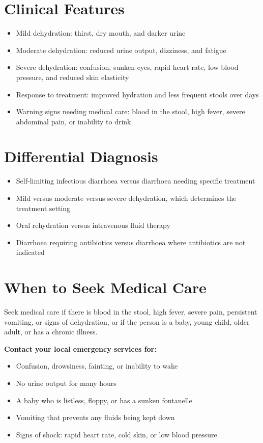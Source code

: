 \section*{Clinical Features}
\begin{itemize}
    \item Mild dehydration: thirst, dry mouth, and darker urine
    \item Moderate dehydration: reduced urine output, dizziness, and fatigue
    \item Severe dehydration: confusion, sunken eyes, rapid heart rate, low blood pressure, and reduced skin elasticity
    \item Response to treatment: improved hydration and less frequent stools over days
    \item Warning signs needing medical care: blood in the stool, high fever, severe abdominal pain, or inability to drink
\end{itemize}

\section*{Differential Diagnosis}
\begin{itemize}
    \item Self-limiting infectious diarrhoea versus diarrhoea needing specific treatment
    \item Mild versus moderate versus severe dehydration, which determines the treatment setting
    \item Oral rehydration versus intravenous fluid therapy
    \item Diarrhoea requiring antibiotics versus diarrhoea where antibiotics are not indicated
\end{itemize}

\section*{When to Seek Medical Care}
Seek medical care if there is blood in the stool, high fever, severe pain, persistent vomiting, or signs of dehydration, or if the person is a baby, young child, older adult, or has a chronic illness.

\textbf{Contact your local emergency services for:}
\begin{itemize}
    \item Confusion, drowsiness, fainting, or inability to wake
    \item No urine output for many hours
    \item A baby who is listless, floppy, or has a sunken fontanelle
    \item Vomiting that prevents any fluids being kept down
    \item Signs of shock: rapid heart rate, cold skin, or low blood pressure
\end{itemize}

